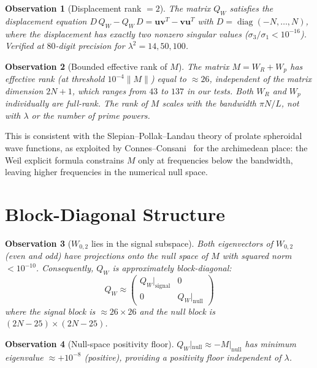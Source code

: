 \documentclass[11pt,a4paper]{article}
\newtheorem{observation}{Observation}[section]
\begin{document}
\begin{observation}[Displacement rank $= 2$]
The matrix $Q_W$ satisfies the displacement equation $D\,Q_W - Q_W\,D = \mathbf{u}\mathbf{v}^T - \mathbf{v}\mathbf{u}^T$ with $D = \operatorname{diag}(-N,\ldots,N)$, where the displacement has exactly two nonzero singular values ($\sigma_3/\sigma_1 < 10^{-16}$). Verified at $80$-digit precision for $\lambda^2 = 14, 50, 100$.
\end{observation}

\begin{observation}[Bounded effective rank of $M$]\label{obs:rank}
The matrix $M = W_R + W_p$ has effective rank (at threshold $10^{-4}\|M\|$) equal to $\approx 26$, independent of the matrix dimension $2N+1$, which ranges from $43$ to $137$ in our tests. Both $W_R$ and $W_p$ individually are full-rank. The rank of $M$ scales with the \emph{bandwidth} $\pi N/L$, not with $\lambda$ or the number of prime powers.
\end{observation}

This is consistent with the Slepian--Pollak--Landau theory of prolate spheroidal wave functions, as exploited by Connes--Consani~\cite{CC2020} for the archimedean place: the Weil explicit formula constrains $M$ only at frequencies below the bandwidth, leaving higher frequencies in the numerical null space.

\section{Block-Diagonal Structure}

\begin{observation}[$W_{0,2}$ lies in the signal subspace]
Both eigenvectors of $W_{0,2}$ (even and odd) have projections onto the null space of $M$ with squared norm $< 10^{-10}$. Consequently, $Q_W$ is approximately block-diagonal:
\[
Q_W \approx \begin{pmatrix} Q_W|_{\mathrm{signal}} & 0 \\ 0 & Q_W|_{\mathrm{null}} \end{pmatrix}
\]
where the signal block is $\approx 26 \times 26$ and the null block is $(2N-25) \times (2N-25)$.
\end{observation}

\begin{observation}[Null-space positivity floor]
$Q_W|_{\mathrm{null}} \approx -M|_{\mathrm{null}}$ has minimum eigenvalue $\approx +10^{-8}$ (positive), providing a positivity floor independent of $\lambda$.
\end{observation}
\end{document}
